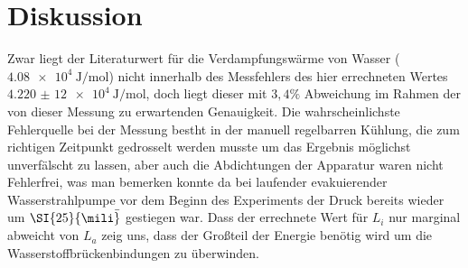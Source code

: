 \section{Diskussion}
\label{sec:Diskussion}

Zwar liegt der Literaturwert für die Verdampfungswärme von Wasser
($\SI{4,08e4}{\joule\per\mole}$) nicht innerhalb des Messfehlers des hier errechneten Wertes $\SI{4,220(12)e4}{\joule\per\mole}$, doch liegt dieser mit $3,4\%$ Abweichung im Rahmen der von dieser Messung zu erwartenden Genauigkeit.
Die wahrscheinlichste Fehlerquelle bei der Messung bestht in der manuell regelbarren Kühlung, die zum richtigen Zeitpunkt gedrosselt werden musste um das Ergebnis möglichst unverfälscht zu lassen,
aber auch die Abdichtungen der Apparatur waren nicht Fehlerfrei,
was man bemerken konnte da bei laufender evakuierender Wasserstrahlpumpe vor dem Beginn des Experiments der Druck bereits wieder um $\SI{25}{\mili\bar}$ gestiegen war.
Dass der errechnete Wert für $L_i$ nur marginal abweicht von $L_a$ zeig uns, 
dass der Großteil der Energie benötig wird um die Wasserstoffbrückenbindungen zu überwinden.